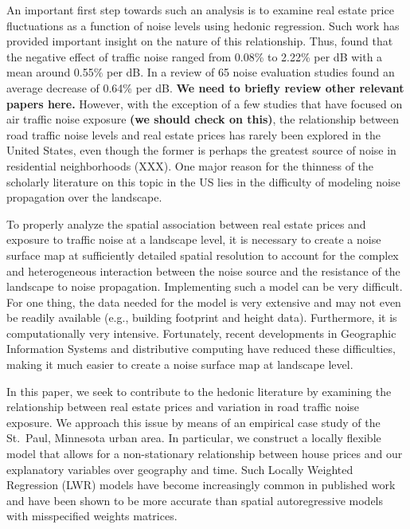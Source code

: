 \documentclass{article}\usepackage{graphicx, color}
\begin{document}
An important first step towards such an analysis is to examine real estate price fluctuations as a function of noise levels using hedonic regression.  Such work has provided important insight on the nature of this relationship.  Thus, \citet{Bateman2001} found that the negative eﬀect of traﬃc noise ranged from 0.08\% to 2.22\% per dB with a mean around 0.55\% per dB. In a review of 65 noise evaluation studies \citet{Navrud2002} found an average decrease of 0.64\% per dB. \textbf{We need to briefly review other relevant papers here.}  However, with the exception of a few studies that have focused on air traffic noise exposure \textbf{(we should check on this)}, the relationship between road traffic noise levels and real estate prices has rarely been explored in the United States, even though the former is perhaps the greatest source of noise in residential neighborhoods (XXX).  One major reason for the thinness of the scholarly literature on this topic in the US lies in the difficulty of modeling noise propagation over the landscape.  

To properly analyze the spatial association between real estate prices and exposure to traffic noise at a landscape level, it is necessary to create a noise surface map at sufficiently detailed spatial resolution to account for the complex and heterogeneous interaction between the noise source and the resistance of the landscape to noise propagation.  Implementing such a model can be very difficult.  For one thing, the data needed for the model is very extensive and may not even be readily available (e.g., building footprint and height data).  Furthermore, it is computationally very intensive. Fortunately, recent developments in Geographic Information Systems and distributive computing have reduced these difficulties, making it much easier to create a noise surface map at landscape level.  

In this paper, we seek to contribute to the hedonic literature by examining the relationship between real estate prices and variation in road traffic noise exposure.  We approach this issue by means of an empirical case study of the St.\ Paul, Minnesota urban area.  In particular, we construct a locally flexible model that allows for a non-stationary relationship between house prices and our explanatory variables over geography and time. Such Locally Weighted Regression (LWR) models have become increasingly common in published work and have been shown to be more accurate than spatial autoregressive models with misspecified weights matrices.
\end{document}
